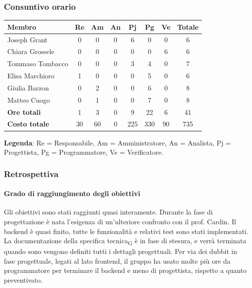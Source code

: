 \documentclass[11pt,a4paper]{article}
\newcommand{\gls}[1]{#1\textsubscript{G}}
\begin{document}
\subsubsection{Consuntivo orario}
\begin{center}
    \begin{tabular}{|l|c|c|c|c|c|c|c|}
        \hline
        \textbf{Membro} & \textbf{Re} & \textbf{Am} & \textbf{An} & \textbf{Pj} & \textbf{Pg} & \textbf{Ve} & \textbf{Totale} \\
        \hline
        Joseph Grant & 0 & 0 & 0 & 6 & 0 & 0 & 6 \\
        \hline
        Chiara Grossele & 0 & 0 & 0 & 0 & 0 & 6 & 6 \\
        \hline
        Tommaso Tombacco & 0 & 0 & 0 & 3 & 4 & 0 & 7 \\
        \hline
        Elisa Marchioro & 1 & 0 & 0 & 0 & 5 & 0 & 6 \\
        \hline
        Giulia Barzon & 0 & 2 & 0 & 0 & 6 & 0 & 8 \\
        \hline
        Matteo Cuogo & 0 & 1 & 0 & 0 & 7 & 0 & 8 \\
        \hline
        \textbf{Ore totali} & 1 & 3 & 0 & 9 & 22 & 6 & 41 \\
        \hline
        \textbf{Costo totale} & 30 & 60 & 0 & 225 & 330 & 90 & 735 \\
        \hline
    \end{tabular}
\end{center}

\noindent \textbf{Legenda}: Re = Responsabile, Am = Amministratore, An = Analista, Pj = Progettista, Pg = Programmatore, Ve = Verificatore.

\subsubsection{Retrospettiva}
\paragraph{Grado di raggiungimento degli obiettivi}
Gli obiettivi sono stati raggiunti quasi interamente. Durante la fase di progettazione è nata l'esigenza di un'ulteriore confronto con il prof. Cardin.
Il backend è quasi finito, tutte le funzionalità e relativi test sono stati implementati.
La documentazione della \gls{specifica tecnica} è in fase di stesura, e verrà terminata quando sono vengono definiti tutti i dettagli progettuali.
Per via dei dubbit in fase progettuale, legati al lato frontend, il gruppo ha usato molte più ore da programmatore per terminare il backend e meno di progettista, rispetto a quanto preventivato.
\end{document}
